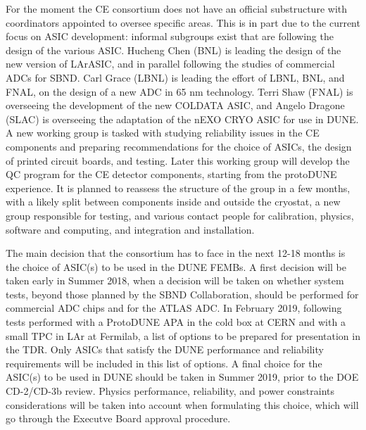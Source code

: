 For the moment the CE consortium does not have an official substructure
with coordinators appointed to oversee specific areas. This is in part due
to the current focus on ASIC development: informal subgroups exist that
are following the design of the various ASIC. Hucheng Chen (BNL) is leading the
design of the new version of LArASIC, and in parallel following the studies
of commercial ADCs for SBND. Carl Grace (LBNL) is leading the effort of
LBNL, BNL, and FNAL, on the design of a new ADC in 65 nm technology. Terri
Shaw (FNAL) is overseeing the development of the new COLDATA ASIC, and
Angelo Dragone (SLAC) is overseeing the adaptation of the nEXO CRYO ASIC
for use in DUNE. A new working group is tasked with studying reliability
issues in the CE components and preparing recommendations for the choice
of ASICs, the design of printed circuit boards, and testing.
Later this working group will develop the QC program for the CE detector
components, starting from the protoDUNE experience. It is planned to
reassess the structure of the group in a few months, with a likely split
between components inside and outside the cryostat, a new group responsible
for testing, and various contact people for calibration, physics, software and
computing, and integration and installation.
 
The main decision that the consortium has to face in the next 12-18 months
is the choice of ASIC(s) to be used in the DUNE FEMBs. A first decision will
be taken early in Summer 2018, when a decision will be taken on whether system
tests, beyond those planned by the SBND Collaboration, should be performed for 
commercial ADC chips and for the ATLAS ADC. In February 2019, following tests
performed with a ProtoDUNE APA in the cold box at CERN and with a small TPC in
LAr at Fermilab, a list of options to be prepared for presentation in the TDR.
Only ASICs that satisfy the DUNE performance and reliability requirements
will be included in this list of options. A final choice for the ASIC(s) to
be used in DUNE should be taken in Summer 2019, prior to the DOE CD-2/CD-3b
review. Physics performance, reliability, and power constraints considerations
will be taken into account when formulating this choice, which will go through
the Executve Board approval procedure.
